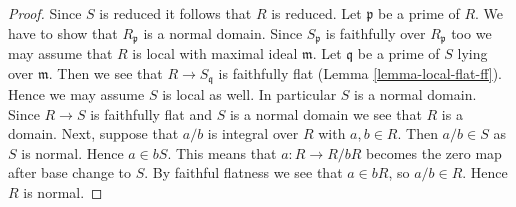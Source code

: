 \begin{proof}
Since $S$ is reduced it follows that $R$ is reduced.
Let $\mathfrak p$ be a prime of $R$. We have to show that
$R_{\mathfrak p}$ is a normal domain. Since $S_{\mathfrak p}$
is faithfully over $R_{\mathfrak p}$ too we may assume that
$R$ is local with maximal ideal $\mathfrak m$.
Let $\mathfrak q$ be a prime of $S$ lying over $\mathfrak m$.
Then we see that $R \to S_{\mathfrak q}$ is faithfully flat
(Lemma \ref{lemma-local-flat-ff}).
Hence we may assume $S$ is local as well.
In particular $S$ is a normal domain.
Since $R \to S$ is faithfully flat
and $S$ is a normal domain we see that $R$ is a domain.
Next, suppose that $a/b$ is integral over $R$ with $a, b \in R$.
Then $a/b \in S$ as $S$ is normal. Hence $a \in bS$.
This means that $a : R \to R/bR$ becomes the zero map
after base change to $S$. By faithful flatness we see that
$a \in bR$, so $a/b \in R$. Hence $R$ is normal.
\end{proof}






















